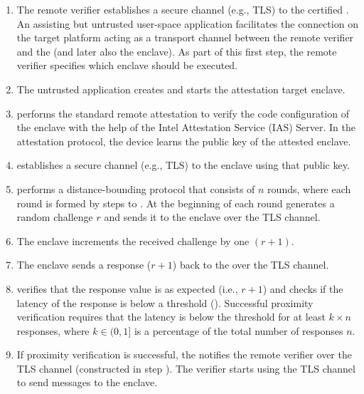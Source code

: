 \begin{enumerate}
  \item[\one] The remote verifier establishes a secure channel (e.g., TLS) to the certified \key. An assisting but untrusted user-space application facilitates the connection on the target platform acting as a transport channel between the remote verifier and the \key (and later also the enclave). As part of this first step, the remote verifier specifies which enclave should be executed.

  \item[\two] The untrusted application creates and starts the attestation target enclave.

  \item[\three] \key performs the standard remote attestation to verify the code configuration of the enclave with the help of the Intel Attestation Service (IAS) Server. In the attestation protocol, the device learns the public key of the attested enclave.

  \item[\four] \key establishes a secure channel (e.g., TLS) to the enclave using that public key.

  \item[\five] \key performs a distance-bounding protocol that consists of $n$ rounds, where each round is formed by steps \five to \eight.
  At the beginning of each round \key generates a random challenge $r$ and sends it to the enclave over the TLS channel.

  \item[\six] The enclave increments the received challenge by one $(r+1)$.

  \item[\seven] The enclave sends a response ($r+1$) back to the \key over the TLS channel.

  \item[\eight] \key verifies that the response value is as expected (i.e., $r+1$) and checks if the latency of the response is below a threshold (\proximitee). Successful proximity verification requires that the latency is below the threshold for at least $k \times n$ responses, where $k \in (0, 1]$ is a percentage of the total number of responses $n$.

  \item[\nine] If proximity verification is successful, the \key notifies the remote verifier over the TLS channel (constructed in step \one). The verifier starts using the \key TLS channel to send messages to the enclave.
\end{enumerate}


